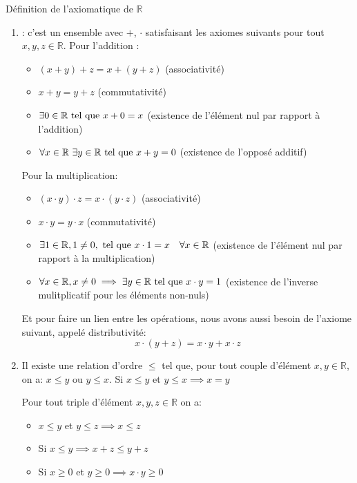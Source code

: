 \documentclass{article}
\begin{document}
\begin{parag}{Définition de l'axiomatique de $\mathbb{R}$}
   \begin{enumerate}[left=0pt]
       \item {}: c'est un ensemble avec $+$, $\cdot$ satisfaisant les axiomes suivants pour tout $x, y, z \in \mathbb{R}$. Pour l'addition :
           \begin{itemize}
               \item $\left(x + y\right) + z = x + \left(y + z\right)$ (associativité)
               \item $x + y = y + z$ (commutativité)
               \item $\exists 0 \in \mathbb{R} \text{ tel que } x + 0 = x$ (existence de l'élément nul par rapport à l'addition)
               \item $\forall x \in \mathbb{R}\ \exists y \in \mathbb{R} \text{ tel que } x + y = 0$ (existence de l'opposé additif)
           \end{itemize}

           Pour la multiplication:
           \begin{itemize}
               \item $\left(x \cdot y\right)\cdot z = x\cdot\left(y\cdot z\right)$ (associativité)
               \item $x \cdot y = y\cdot x$ (commutativité)
               \item $\exists 1 \in \mathbb{R}, 1 \neq 0, \text{ tel que } x\cdot 1 = x \quad \forall x \in \mathbb{R}$  (existence de l'élément nul par rapport à la multiplication)
               \item $\forall x \in \mathbb{R}, x \neq 0 \implies \exists y \in \mathbb{R} \text{ tel que } x\cdot y = 1$  (existence de l'inverse mulitplicatif pour les éléments non-nuls)
           \end{itemize}

           Et pour faire un lien entre les opérations, nous avons aussi besoin de l'axiome suivant, appelé distributivité:
           \[x \cdot \left(y + z\right) = x\cdot y + x\cdot z\]

     \item {} Il existe une relation d'ordre $\leq$ tel que, pour tout couple d'élément $x, y \in \mathbb{R}$, on a: $x \leq y$ ou $y \leq x$. Si $x \leq y$ et $y \leq x \implies x = y$

         Pour tout triple d'élément $x, y, z \in \mathbb{R}$ on a:
         \begin{itemize}
             \item $x \leq y$ et $y \leq z \implies x \leq z$
             \item Si $x \leq y \implies x + z \leq y + z$
             \item Si $x \geq 0$ et $y \geq 0 \implies x\cdot y \geq 0$
         \end{itemize}


\end{enumerate}
\end{parag}
\end{document}
